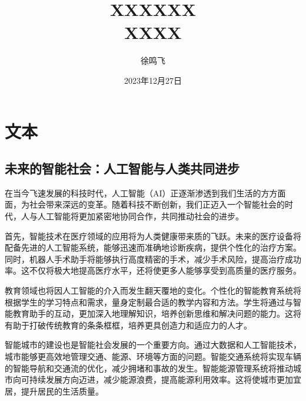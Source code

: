 \documentclass[11pt, a4paper, oneside]{ctexbook}
\title{{\Huge{\textbf{XXXXXX}}}\\XXXX}
\author{徐鸣飞}
\date{2023年12月27日}
\begin{document}
\maketitle

\newpage                    %
\setcounter{page}{1}        %
\tableofcontents            %

\newpage                    %
\setcounter{page}{1}        %

\chapter{文本}
\section{未来的智能社会：人工智能与人类共同进步}
在当今飞速发展的科技时代，人工智能（AI）正逐渐渗透到我们生活的方方面面，为社会带来深远的变革。随着科技不断创新，我们正迈入一个智能社会的时代，人与人工智能将更加紧密地协同合作，共同推动社会的进步。

首先，智能技术在医疗领域的应用将为人类健康带来质的飞跃。未来的医疗设备将配备先进的人工智能系统，能够迅速而准确地诊断疾病，提供个性化的治疗方案。同时，机器人手术助手将能够执行高度精密的手术，减少手术风险，提高治疗成功率。这不仅将极大地提高医疗水平，还将使更多人能够享受到高质量的医疗服务。

教育领域也将因人工智能的介入而发生翻天覆地的变化。个性化的智能教育系统将根据学生的学习特点和需求，量身定制最合适的教学内容和方法。学生将通过与智能教育助手的互动，更加深入地理解知识，培养创新思维和解决问题的能力。这将有助于打破传统教育的条条框框，培养更具创造力和适应力的人才。

智能城市的建设也是智能社会发展的一个重要方向。通过大数据和人工智能技术，城市能够更高效地管理交通、能源、环境等方面的问题。智能交通系统将实现车辆的智能导航和交通流的优化，减少拥堵和事故的发生。智能能源管理系统将推动城市向可持续发展方向迈进，减少能源浪费，提高能源利用效率。这将使城市更加宜居，提升居民的生活质量。
\end{document}

